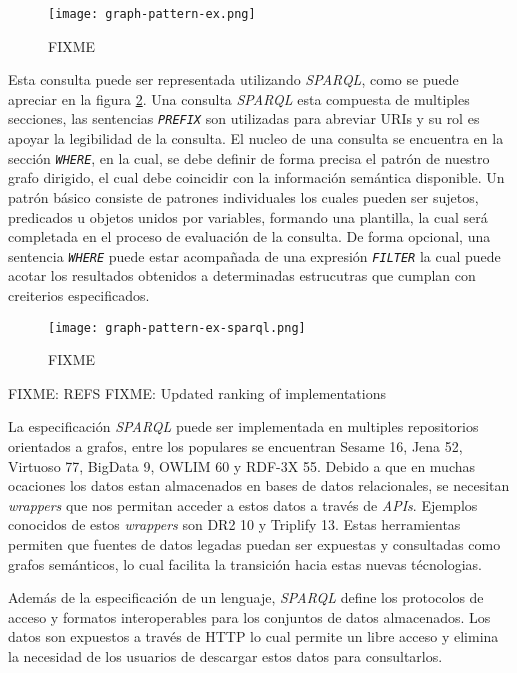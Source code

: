 \begin{figure}
    \centering
    \texttt{[image: graph-pattern-ex.png]}
    \caption{FIXME}
    \label{fig:graph-pattern-ex}
\end{figure}

Esta consulta puede ser representada utilizando \textit{SPARQL}, como se puede
apreciar en la figura \ref{fig:graph-pattern-ex-sparql}. Una consulta
\textit{SPARQL} esta compuesta de multiples secciones, las sentencias
\textit{\texttt{PREFIX}} son utilizadas para abreviar URIs y su rol es apoyar la
legibilidad de la consulta. El nucleo de una consulta se encuentra en la sección
\textit{\texttt{WHERE}}, en la cual, se debe definir de forma precisa el patrón
de nuestro grafo dirigido, el cual debe coincidir con la información semántica
disponible. Un patrón básico consiste de patrones individuales los cuales pueden
ser sujetos, predicados u objetos unidos por variables, formando una plantilla,
la cual será completada en el proceso de evaluación de la consulta. De forma
opcional, una sentencia \textit{\texttt{WHERE}} puede estar acompañada de una
expresión \textit{\texttt{FILTER}} la cual puede acotar los resultados obtenidos
a determinadas estrucutras que cumplan con creiterios especificados.

\begin{figure}
    \centering
    \texttt{[image: graph-pattern-ex-sparql.png]}
    \caption{FIXME}
    \label{fig:graph-pattern-ex-sparql}
\end{figure}

FIXME: REFS FIXME: Updated ranking of implementations

La especificación \textit{SPARQL} puede ser implementada en multiples
repositorios orientados a grafos, entre los populares se encuentran Sesame 16,
Jena 52, Virtuoso 77, BigData 9, OWLIM 60 y RDF-3X 55. Debido a que en muchas
ocaciones los datos estan almacenados en bases de datos relacionales, se
necesitan \textit{wrappers} que nos permitan acceder a estos datos a través de
\textit{APIs}. Ejemplos conocidos de estos \textit{wrappers} son DR2 10 y
Triplify 13. Estas herramientas permiten que fuentes de datos legadas puedan ser
expuestas y consultadas como grafos semánticos, lo cual facilita la transición
hacia estas nuevas técnologias.

Además de la especificación de un lenguaje, \textit{SPARQL} define los
protocolos de acceso y formatos interoperables para los conjuntos de datos
almacenados. Los datos son expuestos a través de HTTP lo cual permite un libre
acceso y elimina la necesidad de los usuarios de descargar estos datos para
consultarlos.


